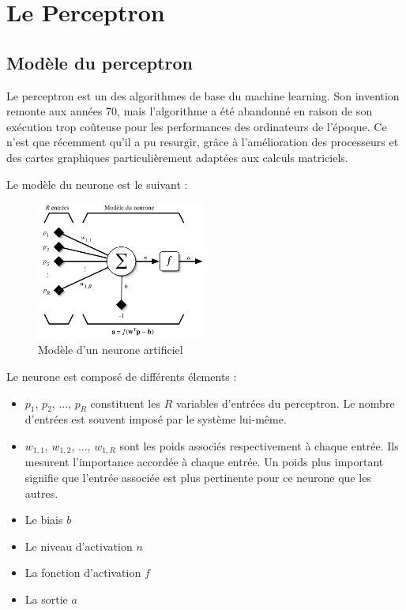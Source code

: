 \section{Le Perceptron}
\fancyhead[R]{\textit{\nouppercase{\leftmark}}}

\subsection{Modèle du perceptron}

Le perceptron est un des algorithmes de base du machine learning. Son invention remonte aux années 70, mais l'algorithme a été abandonné en raison de son exécution trop coûteuse pour les performances des ordinateurs de l’époque. Ce n’est que récemment qu’il a pu resurgir, grâce à l’amélioration des processeurs et des cartes graphiques particulièrement adaptées aux calculs matriciels.

Le modèle du neurone est le suivant : 

\begin{figure}[h]
 \centering
 \includegraphics[width=0.5\textwidth]{img/neurone.png}
 \caption{Modèle d'un neurone artificiel}
\end{figure}

Le neurone est composé de différents élements : 
\begin{itemize}
 \item $p_1$, $p_2$, ..., $p_R$ constituent les $R$ variables d'entrées du perceptron. Le nombre d'entrées est souvent imposé par le système lui-même.
 \item $w_{1,1}$, $w_{1,2}$, ..., $w_{1,R}$ sont les poids associés respectivement à chaque entrée. Ils mesurent l'importance accordée à chaque entrée. Un poids
 plus important signifie que l'entrée associée est plus pertinente pour ce neurone que les autres.
 \item Le biais $b$
 \item Le niveau d'activation $n$
 \item La fonction d'activation $f$
 \item La sortie $a$
\end{itemize}


